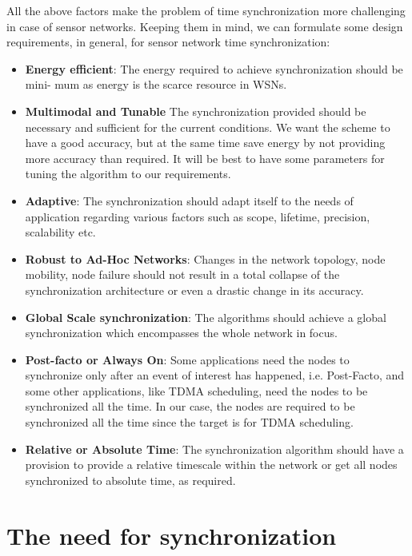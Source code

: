 \documentclass[a4paper,8pt]{report}
\begin{document}
All the above factors make the problem of time synchronization more
challenging in case of sensor networks. Keeping them in mind, we can
formulate some design requirements, in general, for sensor network
time synchronization:
\begin{itemize}
 \item \textbf{Energy efficient}: The energy required to achieve synchronization should be mini-
      mum as energy is the scarce resource in WSNs.
 \item \textbf{Multimodal and Tunable} The synchronization provided should be necessary
      and sufficient for the current conditions. We want the scheme
      to have a good accuracy, but at the same time save energy by not providing more
      accuracy than required. It will be best to have some parameters for tuning the
      algorithm to our requirements.
 \item \textbf{Adaptive}: The synchronization should adapt itself to the needs of application
     regarding various factors such as scope, lifetime, precision, scalability etc.
 \item \textbf{Robust to Ad-Hoc Networks}: Changes in the network topology, node mobility,
    node failure should not result in a total collapse of the synchronization architecture
    or even a drastic change in its accuracy.
 \item \textbf{Global Scale synchronization}: The algorithms should achieve a global synchronization
  which encompasses the whole network in focus.
 \item \textbf{Post-facto or Always On}:  Some applications need the nodes to synchronize
  only after an event of interest has happened, i.e. Post-Facto, and some other
  applications, like TDMA scheduling, need the nodes to be synchronized all the
  time. In our case, the nodes are required to be synchronized all the time since
  the target is for TDMA scheduling.
 \item \textbf{Relative or Absolute Time}: The synchronization algorithm should have a provision
  to provide a relative timescale within the network or get all nodes synchronized
  to absolute time, as required.
\end{itemize}
\section{The need for synchronization}
\end{document}
